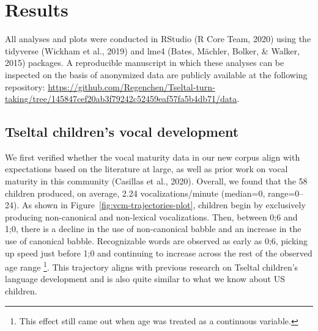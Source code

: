 \documentclass[
  man]{apa6}
\begin{document}
\hypertarget{results}{%
\section{Results}\label{results}}

All analyses and plots were conducted in RStudio (R Core Team, 2020) using the tidyverse (Wickham et al., 2019) and lme4 (Bates, Mächler, Bolker, \& Walker, 2015) packages. A reproducible manuscript in which these analyses can be inspected on the basis of anonymized data are publicly available at the following repository: \url{https://github.com/Regenchen/Tseltal-turn-taking/tree/145847cef20ab3f79242c52459eaf57fa5b4db71/data}.

\hypertarget{tseltal-childrens-vocal-development}{%
\subsection{Tseltal children's vocal development}\label{tseltal-childrens-vocal-development}}

We first verified whether the vocal maturity data in our new corpus align with expectations based on the literature at large, as well as prior work on vocal maturity in this community (Casillas et al., 2020). Overall, we found that the 58 children produced, on average, 2.24 vocalizations/minute (median=0, range=0--24). As shown in Figure~\ref{fig:vcm-trajectories-plot}, children begin by exclusively producing non-canonical and non-lexical vocalizations. Then, between 0;6 and 1;0, there is a decline in the use of non-canonical babble and an increase in the use of canonical babble. Recognizable words are observed as early as 0;6, picking up speed just before 1;0 and continuing to increase across the rest of the observed age range \footnote{This effect still came out when age was treated as a continuous variable.}. This trajectory aligns with previous research on Tseltal children's language development and is also quite similar to what we know about US children.
\end{document}
